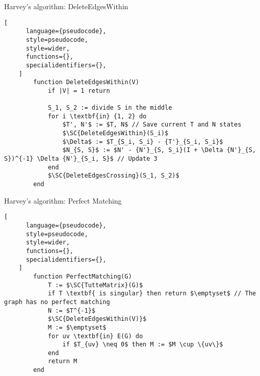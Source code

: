 \begin{programruledcaption}{Harvey's algorithm: DeleteEdgesWithin}
    \begin{lstlisting}[
      language={pseudocode},
      style=pseudocode,
      style=wider,
      functions={},
      specialidentifiers={},
    ]
        function DeleteEdgesWithin(V)
            if |V| = 1 return

            S_1, S_2 := divide S in the middle
            for i \textbf{in} {1, 2} do
                $T', N'$ := $T, N$ // Save current T and N states
                $\SC{DeleteEdgesWithin}(S_i)$
                $\Delta$ := $T_{S_i, S_i} - {T'}_{S_i, S_i}$
                $N_{S, S}$ := $N' - {N'}_{S, S_i}(I + \Delta {N'}_{S, S})^{-1} \Delta {N'}_{S_i, S}$ // Update 3
            end
            $\SC{DeleteEdgesCrossing}(S_1, S_2)$
        end
    \end{lstlisting}
\end{programruledcaption}


\begin{programruledcaption}{Harvey's algorithm: Perfect Matching}
    \begin{lstlisting}[
      language={pseudocode},
      style=pseudocode,
      style=wider,
      functions={},
      specialidentifiers={},
    ]
        function PerfectMatching(G)
            T := $\SC{TutteMatrix}(G)$
            if T \textbf{ is singular} then return $\emptyset$ // The graph has no perfect matching
            N := $T^{-1}$
            $\SC{DeleteEdgesWithin(V)}$
            M := $\emptyset$
            for uv \textbf{in} E(G) do
                if $T_{uv} \neq 0$ then M := $M \cup \{uv\}$
            end
            return M
        end
    \end{lstlisting}
\end{programruledcaption}